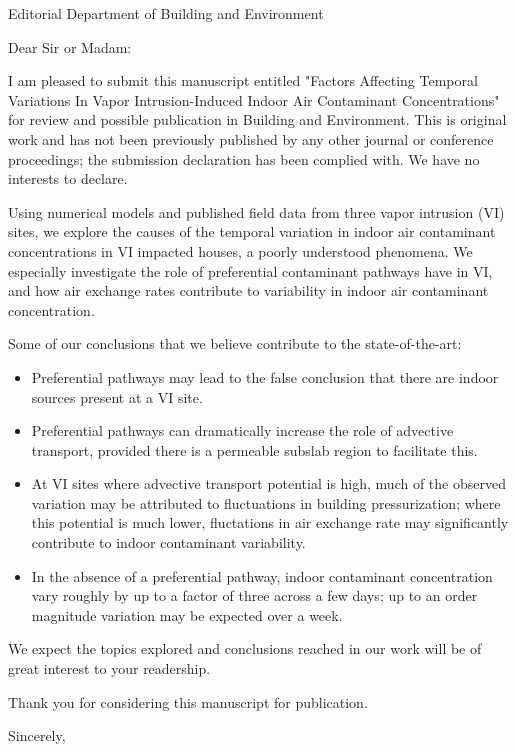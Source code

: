 \documentclass{letter}
\begin{document}
\begin{letter}{Editorial Department of Building and Environment}
\opening{Dear Sir or Madam:}

I am pleased to submit this manuscript entitled "Factors Affecting Temporal Variations In Vapor Intrusion-Induced Indoor Air Contaminant Concentrations" for review and possible publication in Building and Environment.
This is original work and has not been previously published by any other journal or conference proceedings; the submission declaration has been complied with.
We have no interests to declare. 

Using numerical models and published field data from three vapor intrusion (VI) sites, we explore the causes of the temporal variation in indoor air contaminant concentrations in VI impacted houses, a poorly understood phenomena.
We especially investigate the role of preferential contaminant pathways have in VI, and how air exchange rates contribute to variability in indoor air contaminant concentration.

Some of our conclusions that we believe contribute to the state-of-the-art:
\begin{itemize}
  \item Preferential pathways may lead to the false conclusion that there are indoor sources present at a VI site.
  \item Preferential pathways can dramatically increase the role of advective transport, provided there is a permeable subslab region to facilitate this.
  \item At VI sites where advective transport potential is high, much of the observed variation may be attributed to fluctuations in building pressurization; where this potential is much lower, fluctations in air exchange rate may significantly contribute to indoor contaminant variability.
  \item In the absence of a preferential pathway, indoor contaminant concentration vary roughly by up to a factor of three across a few days; up to an order magnitude variation may be expected over a week.
\end{itemize}
We expect the topics explored and conclusions reached in our work will be of great interest to your readership.

Thank you for considering this manuscript for publication.
\closing{Sincerely,}

\end{letter}
\end{document}
